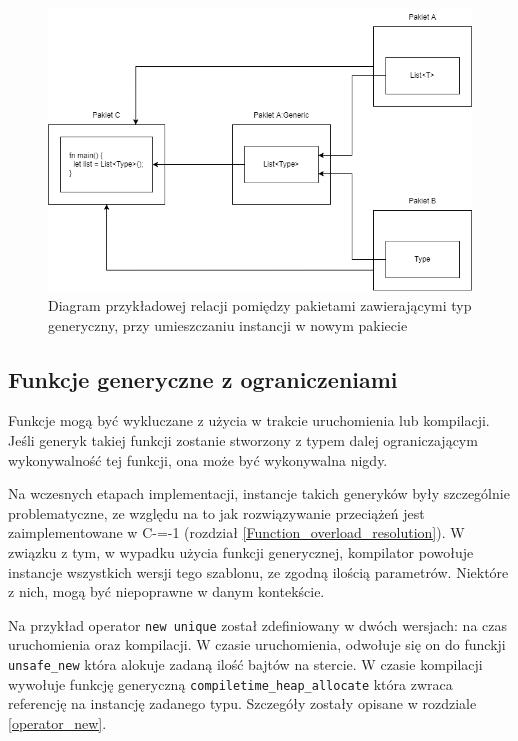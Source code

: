 \begin{figure}
	\caption{Diagram przykładowej relacji pomiędzy pakietami zawierającymi typ generyczny, przy umieszczaniu instancji w nowym pakiecie}
	\label{generic_packages_dependencies:option:new}
	\begin{center}
		\includegraphics[width=\textwidth]{img/generics_placed_in_new.png}
	\end{center}
\end{figure}

\subsection{Funkcje generyczne z ograniczeniami}
\label{challenges:generic_function_limitations}
Funkcje mogą być wykluczane z użycia w trakcie uruchomienia lub kompilacji. Jeśli generyk takiej funkcji zostanie stworzony z typem dalej ograniczającym wykonywalność tej funkcji, ona może być wykonywalna nigdy.

Na wczesnych etapach implementacji, instancje takich generyków były szczególnie problematyczne, ze względu na to jak rozwiązywanie przeciążeń jest zaimplementowane w C-=-1 (rozdział \ref{Function_overload_resolution}).
W związku z tym, w wypadku użycia funkcji generycznej, kompilator powołuje instancje wszystkich wersji tego szablonu, ze zgodną ilością parametrów.
Niektóre z nich, mogą być niepoprawne w danym kontekście. 

Na przykład operator \lstinline{new unique} został zdefiniowany w dwóch wersjach: na czas uruchomienia oraz kompilacji.
W czasie uruchomienia, odwołuje się on do funckji \lstinline{unsafe_new} która alokuje zadaną ilość bajtów na stercie.
W czasie kompilacji wywołuje funkcję generyczną \lstinline{compiletime_heap_allocate} która zwraca referencję na instancję zadanego typu.
Szczegóły zostały opisane w rozdziale \ref{operator_new}.

